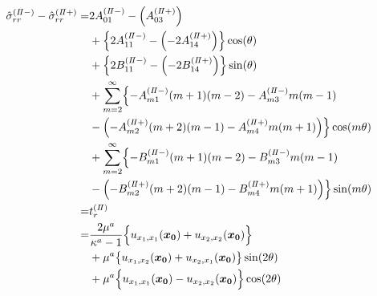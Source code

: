\begin{align}
	\hat{\sigma}_{rr}^{(I\hspace{-.15em}I-)}-\hat{\sigma}_{rr}^{(I\hspace{-.15em}I+)} =
	&2A_{01}^{(I\hspace{-.15em}I-)}-\Bigl(A_{03}^{(I\hspace{-.15em}I+)}\Bigr)
	\nonumber
	\\
	&+\Bigl\{2A_{11}^{(I\hspace{-.15em}I-)}
	-\Bigl(-2A_{14}^{(I\hspace{-.15em}I+)}\Bigr)\Bigr\}\cos(\theta)
	\nonumber
	\\
	&+\Bigl\{2B_{11}^{(I\hspace{-.15em}I-)}
	-\Bigl(-2B_{14}^{(I\hspace{-.15em}I+)}\Bigr)\Bigr\}\sin(\theta)
	\nonumber
	\\
	&+\sum_{m=2}^{\infty}\Bigl\{
	-A_{m1}^{(I\hspace{-.15em}I-)}(m+1)(m-2)-A_{m3}^{(I\hspace{-.15em}I-)}m(m-1)
	\nonumber
	\\
	&-\Bigl(-A_{m2}^{(I\hspace{-.15em}I+)}(m+2)(m-1)-A_{m4}^{(I\hspace{-.15em}I+)}m(m+1)\Bigr)
	\Bigr\}\cos(m\theta)
	\nonumber
	\\
	&+\sum_{m=2}^{\infty}\Bigl\{
	-B_{m1}^{(I\hspace{-.15em}I-)}(m+1)(m-2)-B_{m3}^{(I\hspace{-.15em}I-)}m(m-1)
	\nonumber
	\\
	&-\Bigl(-B_{m2}^{(I\hspace{-.15em}I+)}(m+2)(m-1)-B_{m4}^{(I\hspace{-.15em}I+)}m(m+1)\Bigr)
	\Bigr\}\sin(m\theta)
	\nonumber
	\\
	=&t_{r}^{(I\hspace{-.15em}I)}
	\nonumber
	\\
		=&\frac{2\mu^a}{\kappa^a-1}\Bigl\{ u_{x_{1},x_{1}}(\bm{x_{0}})
			+ u_{x_{2},x_{2}}(\bm{x_{0}})\Bigr\}
			\nonumber
			\\
			&+\mu^a\bigl\{u_{x_{1},x_{2}}(\bm{x_{0}})
			+u_{x_{2},x_{1}}(\bm{x_{0}})\bigr\}\sin(2\theta)
			\nonumber
			\\
			&+\mu^a\Bigl\{ u_{x_{1},x_{1}}(\bm{x_{0}})
			- u_{x_{2},x_{2}}(\bm{x_{0}})\Bigr\}\cos(2\theta)
	\label{eq:SigmaRR2eq}
\end{align}


